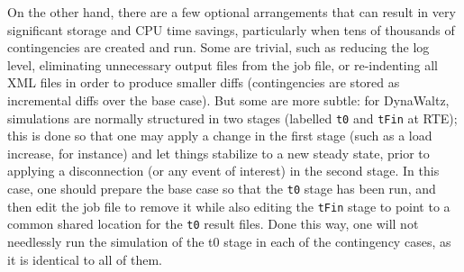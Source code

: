 \documentclass[conference]{IEEEtran}
\newcommand{\code}[1]{\texttt{#1}}
\begin{document}
On the other hand, there are a few optional arrangements that can result in very
significant storage and CPU time savings, particularly when tens of thousands
of contingencies are created and run.  Some are trivial, such as reducing the
log level, eliminating unnecessary output files from the job file, or
re-indenting all XML files in order to produce smaller diffs (contingencies are
stored as incremental diffs over the base case). But some are more subtle: for
DynaWaltz, simulations are normally structured in two stages (labelled \code{t0}
and \code{tFin} at RTE); this is done so that one may apply a change in the
first stage (such as a load increase, for instance) and let things stabilize to
a new steady state, prior to applying a disconnection (or any event of interest)
in the second stage.  In this case, one should prepare the base case so that the
\code{t0} stage has been run, and then edit the job file to remove it while also
editing the \code{tFin} stage to point to a common shared location for the
\code{t0} result files. Done this way, one will not needlessly run the
simulation of the t0 stage in each of the contingency cases, as it is identical
to all of them.
\end{document}
